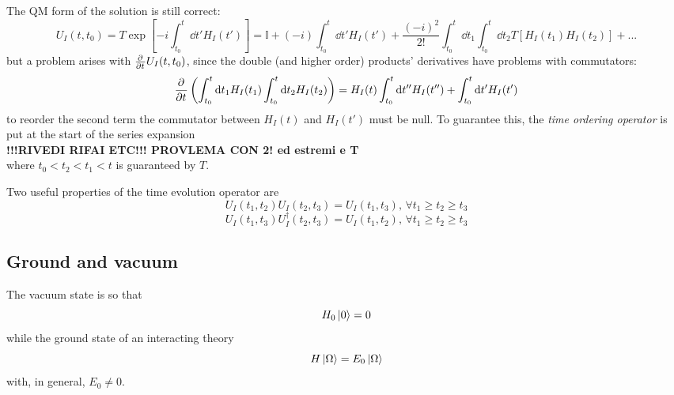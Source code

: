 The QM form of the solution is still correct:
$$U_I(t,t_0) = T\exp\left[-i\int_{t_0}^t \dd t' H_I(t')\right]=
\mathbb{I} + (-i)\int_{t_0}^t \dd t' H_I(t') + \frac{(-i)^2}{2!}\int_{t_0}^t
\dd t_1\int_{t_0}^{t}\dd t_2 T\left[H_I(t_1)H_I(t_2)\right]+...
$$
but a problem arises with $\pdv[]{}{t}U_I(t,t_0)$, since the double (and higher
order) products' derivatives have problems with commutators:
$$\pdv[]{}{t}\left(\int_{t_0}^t \dd t_1 H_I(t_1) \int_{t_0}^t \dd t_2 H_I(t_2)
\right)=H_I(t)\int_{t_0}^t \dd t'' H_I(t'') + \int_{t_0}^t \dd t'H_I(t')$$
to reorder the second term the commutator between $H_I(t)$ and $H_I(t')$ must be
null. To guarantee this, the \textit{time ordering operator} is put at the
start of the series expansion\\
\textbf{!!!RIVEDI RIFAI ETC!!! PROVLEMA CON 2! ed estremi e T}\\
where $t_0<t_2<t_1<t$ is guaranteed by $T$.\\

Two useful properties of the time evolution operator are
$$U_I(t_1,t_2)U_I(t_2,t_3)=U_I(t_1,t_3),\,\forall t_1\geq t_2\geq t_3$$
$$U_I(t_1,t_3)U_I^\dagger(t_2,t_3) = U_I(t_1,t_2),\,\forall t_1\geq t_2\geq t_3$$
\subsection{Ground and vacuum}
The vacuum state is so that
$$H_0\ket{0}=0$$
while the ground state of an interacting theory
$$H\ket{\Omega}=E_0\ket{\Omega}$$
with, in general, $E_0\neq 0$.

